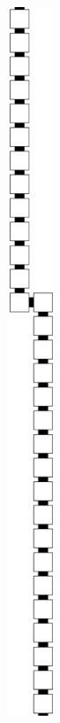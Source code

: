 \begin{itemize}
\begin{figure}[H]
\begin{subfigure}[t]{0.24\textwidth}
                \includegraphics[width=0.15\textwidth]{warping/pre_warp_case1_digit1_msr}

\end{subfigure}
\end{figure}
\end{itemize}
